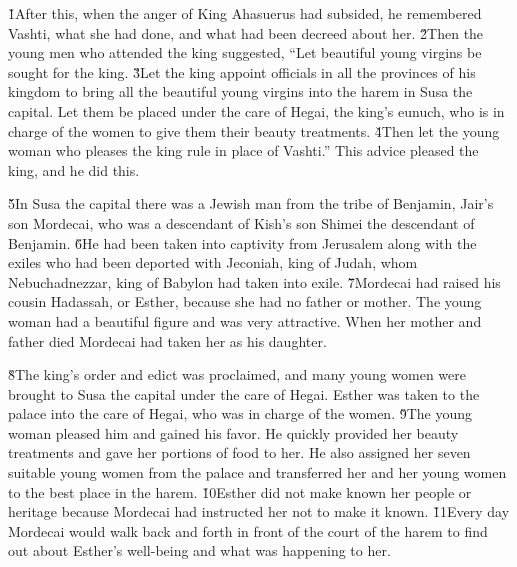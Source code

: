 \v{1}After this, when the anger of King Ahasuerus had subsided, he remembered Vashti, what she had done, and what had been decreed about her. \v{2}Then the young men who attended the king suggested, ``Let beautiful young virgins be sought for the king. \v{3}Let the king appoint officials in all the provinces of his kingdom to bring all the beautiful young virgins into the harem in Susa the capital. Let them be placed under the care of Hegai, the king's eunuch, who is in charge of the women to give them their beauty treatments. \v{4}Then let the young woman who pleases the king rule in place of Vashti.'' This advice pleased the king, and he did this.

\v{5}In Susa the capital there was a Jewish man from the tribe of Benjamin, Jair's son Mordecai, who was a descendant of Kish's son Shimei the descendant of Benjamin. \v{6}He had been taken into captivity from Jerusalem along with the exiles who had been deported with Jeconiah, king of Judah, whom Nebuchadnezzar, king of Babylon had taken into exile. \v{7}Mordecai had raised his cousin Hadassah, or Esther, because she had no father or mother. The young woman had a beautiful figure and was very attractive. When her mother and father died Mordecai had taken her as his daughter.

\v{8}The king's order and edict was proclaimed, and many young women were brought to Susa the capital under the care of Hegai. Esther was taken to the palace into the care of Hegai, who was in charge of the women. \v{9}The young woman pleased him and gained his favor. He quickly provided her beauty treatments and gave her portions of food to her. He also assigned her seven suitable young women from the palace and transferred her and her young women to the best place in the harem. \v{10}Esther did not make known her people or heritage because Mordecai had instructed her not to make it known. \v{11}Every day Mordecai would walk back and forth in front of the court of the harem to find out about Esther's well-being and what was happening to her.

